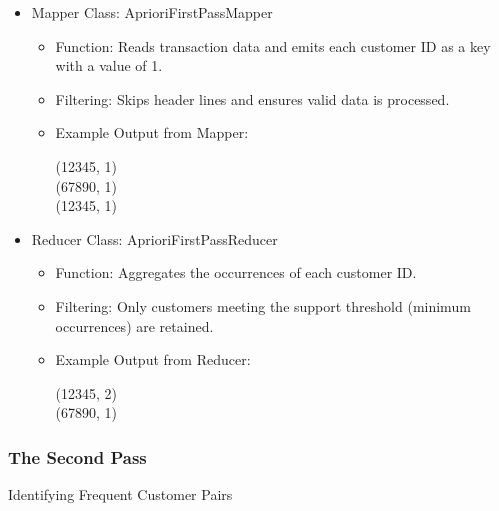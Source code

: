 \begin{itemize}
    \item Mapper Class: AprioriFirstPassMapper
    \begin{itemize}
        \item Function: Reads transaction data and emits each customer ID as a key with a value of 1.
        \item Filtering: Skips header lines and ensures valid data is processed.
        \item Example Output from Mapper:
        \begin{center}
        (12345, 1)\\
        (67890, 1)\\
        (12345, 1)
        \end{center}
    \end{itemize}

    \item Reducer Class: AprioriFirstPassReducer
    \begin{itemize}
        \item Function: Aggregates the occurrences of each customer ID.
        \item Filtering: Only customers meeting the support threshold (minimum occurrences) are retained.
        \item Example Output from Reducer:
        \begin{center}
        (12345, 2)\\
        (67890, 1)
        \end{center}
    \end{itemize}
\end{itemize}

\subsubsection{The Second Pass} Identifying Frequent Customer Pairs


